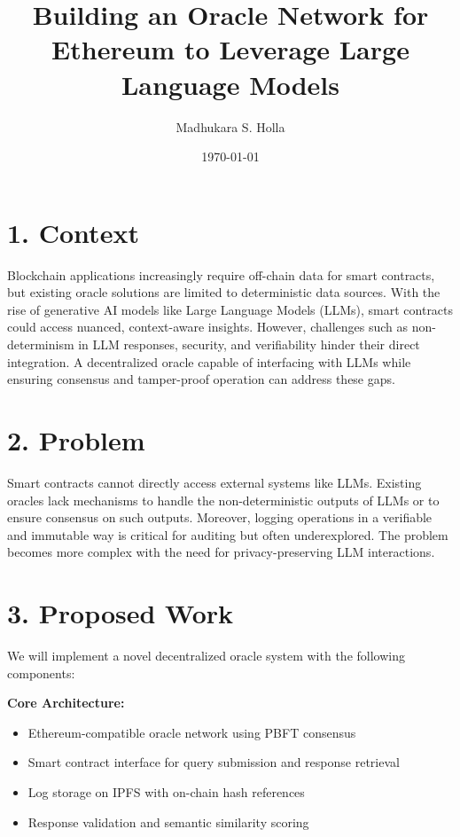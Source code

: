 \documentclass[12pt]{article}
\title{Building an Oracle Network for Ethereum to Leverage Large Language Models}
\author{Madhukara S. Holla}
\date{\today}
\begin{document}
\maketitle

\section*{1. Context}
Blockchain applications increasingly require off-chain data for smart contracts, but existing oracle solutions are limited to deterministic data sources. With the rise of generative AI models like Large Language Models (LLMs), smart contracts could access nuanced, context-aware insights. However, challenges such as non-determinism in LLM responses, security, and verifiability hinder their direct integration. A decentralized oracle capable of interfacing with LLMs while ensuring consensus and tamper-proof operation can address these gaps.

\section*{2. Problem}
Smart contracts cannot directly access external systems like LLMs. Existing oracles lack mechanisms to handle the non-deterministic outputs of LLMs or to ensure consensus on such outputs. Moreover, logging operations in a verifiable and immutable way is critical for auditing but often underexplored. The problem becomes more complex with the need for privacy-preserving LLM interactions.

\section*{3. Proposed Work}
We will implement a novel decentralized oracle system with the following components:

\textbf{Core Architecture:}
\begin{itemize}
    \item Ethereum-compatible oracle network using PBFT consensus
    \item Smart contract interface for query submission and response retrieval
    \item Log storage on IPFS with on-chain hash references
    \item Response validation and semantic similarity scoring
\end{itemize}
\end{document}
